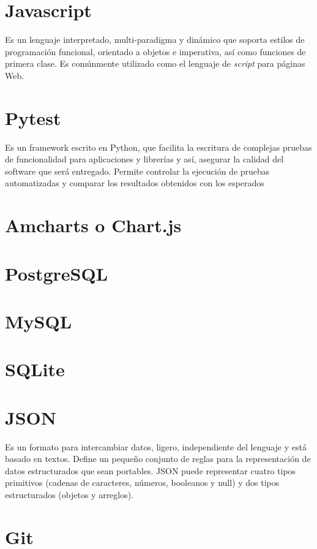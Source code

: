 \section{Javascript}

Es un lenguaje interpretado, multi-paradigma y dinámico que soporta estilos de programación funcional,  orientado a objetos e imperativa, así como funciones de primera clase. Es comúnmente utilizado como el lenguaje de \textit{script} para páginas Web. \cite{javascript}

\section{Pytest}

Es un framework escrito en Python, que facilita la escritura de complejas pruebas de funcionalidad para aplicaciones y librerías y así, asegurar la calidad del software que será entregado. Permite controlar la ejecución de pruebas automatizadas y comparar los resultados obtenidos con los esperados \cite{pytest}

\section{Amcharts o Chart.js}
\section{PostgreSQL}
\section{MySQL}
\section{SQLite}

\section{JSON}

Es un formato para intercambiar datos, ligero, independiente del lenguaje y está basado en textos. Define un pequeño conjunto de reglas para la representación de datos estructurados que sean portables. JSON puede representar cuatro tipos primitivos (cadenas de caracteres, números, booleanos y null) y dos tipos estructurados (objetos y arreglos). \cite{JSON}

\section{Git}

